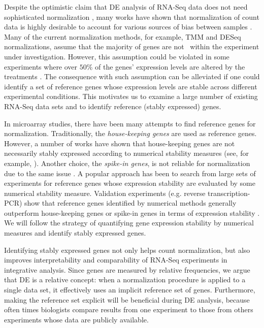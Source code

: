 Despite the optimistic claim that DE analysis of RNA-Seq data does not need 
sophisticated normalization \citep{wang2009rna}, many works have shown that normalization of count 
data is highly desirable to account for various sources of bias between samples
\citep{anders2010differential,dillies2013comprehensive,hansen2012removing, risso2014nat,
	risso2011gc,robinson2010scaling}.
Many of the current normalization methods, for example, TMM \citep{robinson2010scaling} and DESeq
\citep{anders2010differential} normalizations, assume that the majority of genes are not \DED~within
the experiment under investigation. However, this assumption could be violated in some experiments
where over $50\%$ of the genes' expression levels are altered by the treatments
\citep{loven2012revisiting, wu2013use}. The consequence with such assumption can be alleviated if
one could identify a set of reference genes whose expression levels are stable across
different experimental conditions. This motivates us to examine a large number of existing RNA-Seq 
data sets and to identify reference (stably expressed) genes. 

In microarray studies, there have been many attempts to find reference genes for normalization.
Traditionally, the \textit{house-keeping genes}  are used as reference genes.
However, a number of works have shown that house-keeping genes are not necessarily stably expressed
according to numerical stability measures (see, for example,
\cite{czechowski2005genome,huggett2005real}). Another choice, the \textit{spike-in genes}, is not
reliable for normalization due to the same issue \citep{risso2014nat}. A popular approach has been
to search from large sets of experiments for reference genes
\citep{czechowski2005genome,dekkers2012identification,frericks2008toolbox,gur2009identification,stamova2009identification}
whose expression stability are evaluated by some numerical stability measure. Validation 
experiments (e.g. reverse
transcription-PCR) show that reference genes identified by numerical methods generally outperform 
house-keeping genes or spike-in genes in terms of expression stability 
\citep{czechowski2005genome,hruz2011refgenes}.
We will follow the strategy of quantifying gene expression stability by numerical measures and
identify stably expressed genes.

Identifying stably expressed genes not only helps count normalization, but also improves
interpretability and comparability of RNA-Seq experiments in integrative analysis. Since genes are
measured by relative frequencies, we argue that DE is a relative concept: when a normalization
procedure is applied to a single data set, it effectively uses an implicit reference set of genes.
Furthermore, making the reference set explicit will be beneficial during DE analysis, because often 
times biologists compare results from one experiment to those from others experiments whose data 
are publicly
available. 

